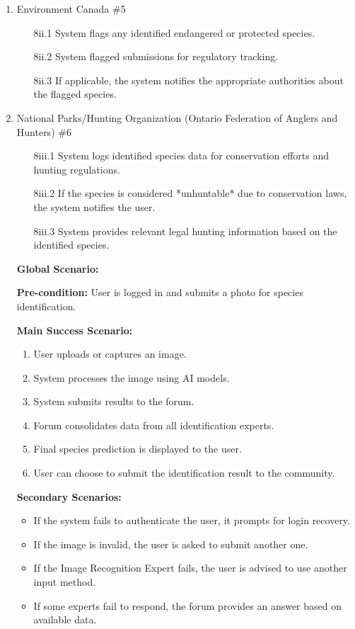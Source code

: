 \documentclass[]{article}
\begin{document}
\begin{enumerate}[{\bf BE1.}]
\begin{enumerate}[{\bf VP1.}]
        \item Environment Canada \#5 \\
\begin{enumerate}
    \item[8ii.1] System  flags any identified endangered or protected species.
    \item[8ii.2]    System flagged submissions for regulatory tracking.
    \item[8ii.3] If applicable, the system notifies the appropriate authorities about the flagged species.
\end{enumerate}



\item National Parks/Hunting Organization (Ontario Federation of Anglers and Hunters) \#6 \\
\begin{enumerate}
    \item [8iii.1] System logs identified species data for conservation efforts and hunting regulations.
    \item[8iii.2] If the species is considered *unhuntable* due to conservation laws, the system notifies the user.
    \item[8iii.3] System provides relevant legal hunting information based on the identified species.
\end{enumerate}
    \textbf{Global Scenario:}

    \noindent \textbf{Pre-condition:}  
User is logged in and submits a photo for species identification.

\noindent \textbf{Main Success Scenario:}
\begin{enumerate}
    \item User uploads or captures an image.
    \item System processes the image using AI models.
    \item System submits results to the forum.
    \item Forum consolidates data from all identification experts.
    \item Final species prediction is displayed to the user.
    \item User can choose to submit the identification result to the community.
\end{enumerate}

\noindent \textbf{Secondary Scenarios:}
\begin{itemize}
    \item If the system fails to authenticate the user, it prompts for login recovery.
    \item If the image is invalid, the user is asked to submit another one.
    \item If the Image Recognition Expert fails, the user is advised to use another input method.
    \item If some experts fail to respond, the forum provides an answer based on available data.
\end{itemize}
\end{enumerate}


\end{enumerate}
\end{document}
